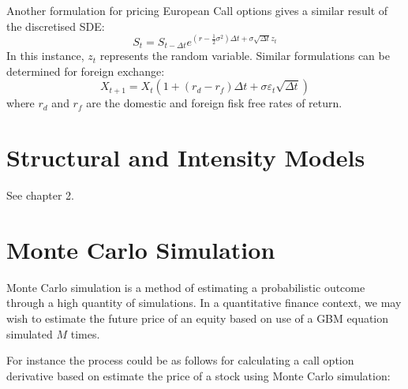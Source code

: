 Another formulation for pricing European Call options gives a similar result of the discretised SDE\cite{pyfinanceoreilly}:
\begin{equation}
S_t=S_{t-\Delta t}e^{(r-\frac{1}{2}\sigma^2)\Delta t+\sigma\sqrt{\Delta t}z_t}
\end{equation} 
In this instance, $z_t$ represents the random variable. Similar formulations can be determined for foreign exchange:
\begin{equation}
X_{t+1} = X_t(1+(r_d-r_f)\Delta{}t+\sigma\varepsilon_t\sqrt{\Delta{}t})
\label{eq:foreignexchangemodel}
\end{equation}
where $r_d$ and $r_f$ are the domestic and foreign fisk free rates of return. 



\section{Structural and Intensity Models}
\TODO See \cite{advancedquantcpp} chapter 2.

\section{Monte Carlo Simulation}
Monte Carlo simulation is a method of estimating a probabilistic outcome through a high quantity of simulations. In a quantitative finance context, we may wish to estimate the future price of an equity based on use of a GBM equation simulated $M$ times. 

For instance the process could be as follows for calculating a call option derivative based on estimate the price of a stock using Monte Carlo simulation:

